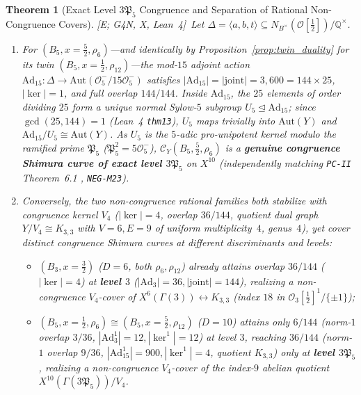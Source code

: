 \documentclass[11pt]{amsart}
\numberwithin{equation}{section}
\theoremstyle{plain}
\newtheorem{theorem}{Theorem}[section]
\theoremstyle{definition}\newtheorem{definition}[theorem]{Definition}
\theoremstyle{remark}\newtheorem{remark}[theorem]{Remark}
\newcommand{\Q}{\mathbb{Q}}
\newcommand{\calO}{\mathcal{O}}
\newcommand{\calC}{\mathcal{C}}
\newcommand{\frP}{\mathfrak{P}}
\newcommand{\Aut}{\mathrm{Aut}}
\newcommand{\Ad}{\mathrm{Ad}}
\newcommand{\ctag}[1]{\textup{\textsf{\scriptsize[#1]}}}
\begin{document}
\begin{theorem}[Exact Level $3\frP_5$ Congruence and Separation of Rational Non-Congruence Covers]\label{thm:rational_cong}
\ctag{E; G4N, X, Lean~4}\ Let $\Delta = \langle a,b,t\rangle \subseteq N_{B^\times}(\calO[\frac{1}{2}])/\Q^\times$.
\begin{enumerate}[label=(\arabic*),nosep]
\item For $(B_5, x=\frac{5}{2}, \rho_6)$---and identically by Proposition~\ref{prop:twin_duality} for its twin $(B_5, x=\frac{1}{2}, \rho_{12})$---the mod-$15$ adjoint action $\Ad_{15} : \Delta \to \Aut(\calO_5^-/15\calO_5^-)$ satisfies $|\Ad_{15}| = |\mathrm{joint}| = 3{,}600 = 144\times 25$, $|\ker| = 1$, and full overlap $144/144$. Inside $\Ad_{15}$, the $25$ elements of order dividing $25$ form a unique normal Sylow-$5$ subgroup $U_5 \trianglelefteq \Ad_{15}$; since $\gcd(25, 144) = 1$ (Lean~4 \texttt{thm13}), $U_5$ maps trivially into $\Aut(Y)$ and $\Ad_{15}/U_5 \cong \Aut(Y)$. As $U_5$ is the $5$-adic pro-unipotent kernel modulo the ramified prime $\frP_5$ ($\frP_5^2 = 5\calO_5^-$), $\calC_Y(B_5, \frac{5}{2}, \rho_6)$ is a \textbf{genuine congruence Shimura curve of exact level $3\frP_5$} on $X^{10}$ (independently matching \texttt{PC-II} Theorem~6.1 \cite{ergentics2026pc2}, \texttt{NEG-M23}).
\item Conversely, the two non-congruence rational families both stabilize with congruence kernel $V_4$ ($|\ker|=4$, overlap $36/144$, quotient dual graph $Y/V_4 \cong K_{3,3}$ with $V=6, E=9$ of uniform multiplicity~$4$, genus~$4$), yet cover \emph{distinct} congruence Shimura curves at different discriminants and levels:
\begin{itemize}[nosep]
\item $(B_3, x=\frac{3}{2})$ ($D=6$, both $\rho_6,\rho_{12}$) already attains overlap $36/144$ ($|\ker|=4$) at \textbf{level $3$} ($|\Ad_3|=36, |\mathrm{joint}|=144$), realizing a non-congruence $V_4$-cover of $X^6(\Gamma(3)) \leftrightarrow K_{3,3}$ (index $18$ in $\calO_3[\frac{1}{2}]^1/\{\pm 1\}$);
\item $(B_5, x=\frac{1}{2}, \rho_6) \cong (B_5, x=\frac{5}{2}, \rho_{12})$ ($D=10$) attains only $6/144$ (norm-$1$ overlap $3/36$, $|\Ad_3^1|=12, |\ker^1|=12$) at level $3$, reaching $36/144$ (norm-$1$ overlap $9/36$, $|\Ad_{15}^1|=900, |\ker^1|=4$, quotient $K_{3,3}$) only at \textbf{level $3\frP_5$}, realizing a non-congruence $V_4$-cover of the index-$9$ abelian quotient $X^{10}(\Gamma(3\frP_5))/V_4$.
\end{itemize}
\end{enumerate}
\end{theorem}
\end{document}
